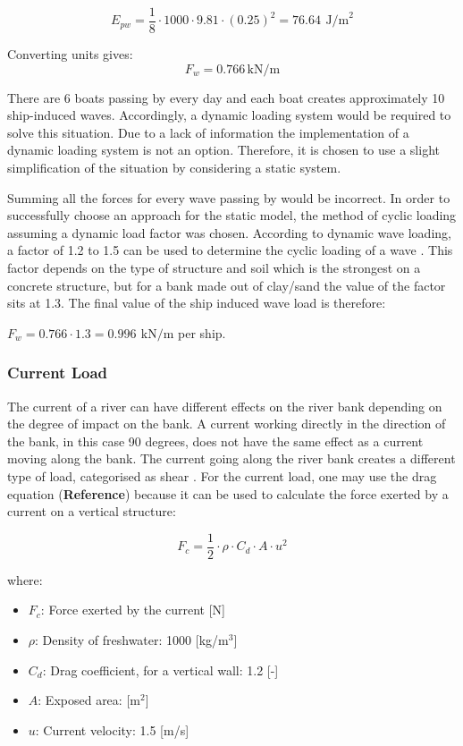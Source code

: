 $$
E_{pw} = \frac{1}{8} \cdot 1000 \cdot 9.81 \cdot (0.25)^2 = 76.64 \, ~\text{J/m}^2
$$

Converting units gives:
$$
{F_w}= 0.766 \, \text{kN/m}
$$

There are 6 boats passing by every day and each boat creates approximately 10 ship-induced waves. Accordingly, a dynamic loading system would be required to solve this situation. Due to a lack of information the implementation of a dynamic loading system is not an option. Therefore, it is chosen to use a slight simplification of the situation by considering a static system. 

Summing all the forces for every wave passing by would be incorrect. In order to successfully choose an approach for the static model, the method of cyclic loading assuming a dynamic load factor was chosen. According to dynamic wave loading, a factor of 1.2 to 1.5 can be used to determine the cyclic loading of a wave \autocite{cuomoDynamicWaveLoads2004}. This factor depends on the type of structure and soil which is the strongest on a concrete structure, but for a bank made out of clay/sand the value of the factor sits at 1.3. The final value of the ship induced wave load is therefore:

$ F_{w} = 0.766 \cdot 1.3 = 0.996  \, ~\text{kN/m}$ per ship. 

\subsubsection{Current Load}
The current of a river can have different effects on the river bank depending on the degree of impact on the bank. A current working directly in the direction of the bank, in this case 90 degrees, does not have the same effect as a current moving along the bank. The current going along the river bank creates a different type of load, categorised as shear \autocite{chowOpenChannelHydraulics}.
For the current load, one may use the drag equation (\textbf{Reference})
because it can be used to calculate the force exerted by a current on a vertical structure:

\begin{equation}
\label{eq:drag load}
    F_c = \frac{1}{2} \cdot \rho \cdot C_d \cdot A \cdot u^2
\end{equation}


\noindent where:
\begin{itemize}
    \item \textbf{$ F_c $}: Force exerted by the current [N]
    \item \textbf{$ \rho $}: Density of freshwater: 1000 [kg/m$^3$]
    \item \textbf{$ C_d $}: Drag coefficient, for a vertical wall: 1.2 [-]
    \item \textbf{$ A $}: Exposed area:  [m$^2$]
    \item \textbf{$ u $}: Current velocity: 1.5 [m/s]
\end{itemize}

